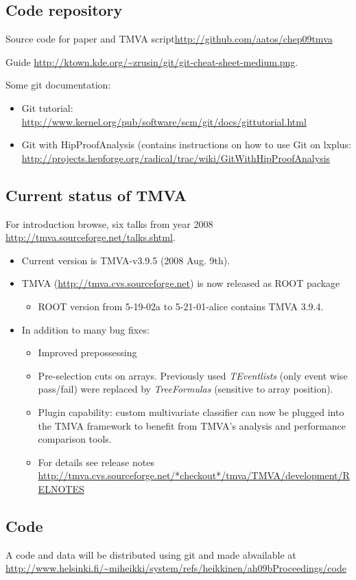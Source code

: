 \begin{appendix}
\subsection{Code repository}
Source code for paper and TMVA script\url{http://github.com/aatos/chep09tmva}

Guide \url{http://ktown.kde.org/~zrusin/git/git-cheat-sheet-medium.png}.

Some git documentation:
\begin{itemize}
\item Git tutorial: \url{http://www.kernel.org/pub/software/scm/git/docs/gittutorial.html}
\item Git with HipProofAnalysis (contains instructions on how to use
  Git on lxplus:
  \url{http://projects.hepforge.org/radical/trac/wiki/GitWithHipProofAnalysis}
\end{itemize}

\subsection{Current status of TMVA}
For introduction browse, six talks from year 2008 \url{http://tmva.sourceforge.net/talks.shtml}.

\begin{itemize}
\item Current version is TMVA-v3.9.5 (2008 Aug. 9th).
\item TMVA (\url{http://tmva.cvs.sourceforge.net}) is now released as ROOT package

\begin{itemize}
\item ROOT version from 5-19-02a to 5-21-01-alice contains TMVA 3.9.4.
\end{itemize}

\item In addition to many bug fixes:
\begin{itemize}
\item Improved prepossessing
\item Pre-selection cuts on arrays. Previously used {\em TEventlists} 
(only event  wise pass/fail) were replaced by {\em TreeFormulas} (sensitive to array position).
\item Plugin capability: custom multivariate classifier can now be plugged into
    the TMVA framework to benefit from TMVA's analysis and performance comparison
    tools. 

\item For details see release notes 
\url{http://tmva.cvs.sourceforge.net/*checkout*/tmva/TMVA/development/RELNOTES}
\end{itemize}

\end{itemize}
\subsection{Code}
A code and data will be distributed using git and made abvailable 
at \\ \url{http://www.helsinki.fi/~miheikki/system/refs/heikkinen/ah09bProceedings/code}
\end{appendix}

